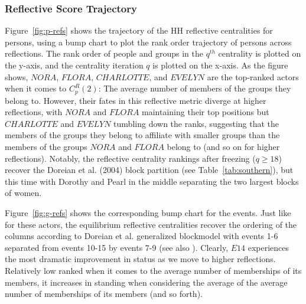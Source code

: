 \documentclass[a4paper,fleqn]{cas-sc}
\begin{document}
\subsubsection{Reflective Score Trajectory}
Figure~\ref{fig:p-refs} shows the trajectory of the HH reflective centralities for persons, using a bump chart to plot the rank order trajectory of persons across reflections. The rank order of people and groups in the $q^{th}$ centrality is plotted on the y-axis, and the centrality iteration $q$ is plotted on the x-axis. As the figure shows, $NORA$, $FLORA$, $CHARLOTTE$, and $EVELYN$ are the top-ranked actors when it comes to $C^R_p(2)$:  The average number of members of the groups they belong to. However, their fates in this reflective metric diverge at higher reflections, with $NORA$ and $FLORA$ maintaining their top positions but $CHARLOTTE$ and $EVELYN$ tumbling down the ranks, suggesting that the members of the groups they belong to affiliate with smaller groups than the members of the groups $NORA$ and $FLORA$ belong to (and so on for higher reflections). Notably, the reflective centrality rankings after freezing ($q \geq 18$) recover the Doreian et al. (2004) block partition (see Table~\ref{tab:southern}), but this time with Dorothy and Pearl in the middle separating the two largest blocks of women. 

Figure~\ref{fig:g-refs} shows the corresponding bump chart for the events. Just like for these actors, the equilibrium reflective centralities recover the ordering of the columns according to Doreian et al. generalized blockmodel with events 1-6 separated from events 10-15 by events 7-9 (see also \citet{kovacs2010generalized}). Clearly, $E14$ experiences the most dramatic improvement in status as we move to higher reflections. Relatively low ranked when it comes to the average number of memberships of its members, it increases in standing when considering the average of the average number of memberships of its members (and so forth). 
\end{document}
